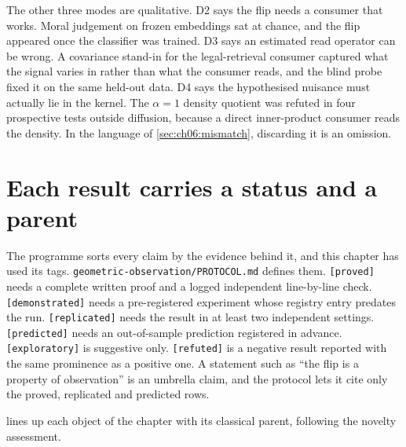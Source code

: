 The other three modes are qualitative. D2 says the flip needs a consumer that works. Moral judgement on frozen embeddings sat at chance, and the flip appeared once the classifier was trained. D3 says an estimated read operator can be wrong. A covariance stand-in for the legal-retrieval consumer captured what the signal varies in rather than what the consumer reads, and the blind probe fixed it on the same held-out data. D4 says the hypothesised nuisance must actually lie in the kernel. The $\alpha=1$ density quotient was refuted in four prospective tests outside diffusion, because a direct inner-product consumer reads the density. In the language of \cref{sec:ch06:mismatch}, discarding it is an omission.



\section{Each result carries a status and a parent}\label{sec:ch06:status}

The programme sorts every claim by the evidence behind it, and this chapter has used its tags. \texttt{geometric-\allowbreak observation/\allowbreak PROTOCOL.md} defines them. \texttt{[proved]} needs a complete written proof and a logged independent line-by-line check. \texttt{[demonstrated]} needs a pre-registered experiment whose registry entry predates the run. \texttt{[replicated]} needs the result in at least two independent settings. \texttt{[predicted]} needs an out-of-sample prediction registered in advance. \texttt{[exploratory]} is suggestive only. \texttt{[refuted]} is a negative result reported with the same prominence as a positive one. A statement such as ``the flip is a property of observation'' is an umbrella claim, and the protocol lets it cite only the proved, replicated and predicted rows.

 lines up each object of the chapter with its classical parent, following the novelty assessment.

